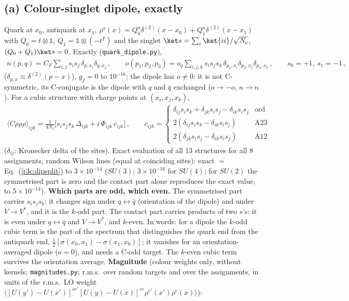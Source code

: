 \subsection{(a) Colour-singlet dipole, exactly}\label{r3c:dipole}
Quark at $x_0$, antiquark at $x_1$, $\rho^a(x)=Q_0^a\delta^{(2)}(x-x_0)+Q_1^a\delta^{(2)}(x-x_1)$ with $Q_0=t\otimes\mathbb 1$, $Q_1=\mathbb 1\otimes(-t^T)$ and the singlet $\ket s=\sum_i\ket{ii}/\sqrt{N_c}$, $(Q_0+Q_1)\ket s=0$. Exactly (\texttt{quark\_dipole.py}),
\begin{align}\label{r3c:dip}
n(p,q)=C_F\sum_{i,j}s_is_j\,\delta_{p,x_i}\delta_{q,x_j}\,,\qquad o(p_1,p_2,p_3)=o_q\sum_{i,j,k}s_is_js_k\,\delta_{p_1,x_i}\delta_{p_2,x_j}\delta_{p_3,x_k}\,,\qquad s_0=+1,\ s_1=-1\,,
\end{align}
($\delta_{p,x}\equiv\delta^{(2)}(p-x)$), $g_f=0$ to $10^{-16}$; the dipole has $o\neq0$: it is not C-symmetric, its C-conjugate is the dipole with $q$ and $\bar q$ exchanged ($o\to-o$, $n\to n$). For a cubic structure with charge points at $(x_i,x_j,x_k)$,
\begin{align}\label{r3c:dipsplit}
\langle C\rho\rho\rho\rangle_{ijk}=\frac{1}{4N_c}\Big[s_is_js_k\,\Delta_{ijk}+i\,\Phi_{ijk}\,c_{ijk}\Big]\,,\qquad
c_{ijk}=\begin{cases}\delta_{ij}s_is_k+\delta_{jk}s_is_j-\delta_{ik}s_is_j&\text{ord}\\ 2(\delta_{ij}s_is_k-\delta_{ik}s_is_j)&\text{A23}\\ 2(\delta_{jk}s_is_j-\delta_{ik}s_is_j)&\text{A12}\end{cases}
\end{align}
($\delta_{ij}$: Kronecker delta of the sites). Exact evaluation of all 13 structures for all 8 assignments, random Wilson lines (equal at coinciding sites): exact $=$ Eq.~(\ref{r3c:dipsplit}) to $3\times10^{-14}$ ($SU(3)$; $3\times10^{-16}$ for $SU(4)$; for $SU(2)$ the symmetrised part is zero and the contact part alone reproduces the exact value, to $5\times10^{-14}$). \textbf{Which parts are odd, which even.} The symmetrised part carries $s_is_js_k$: it changes sign under $q\leftrightarrow\bar q$ (orientation of the dipole) and under $V\to V^*$, and it is the $k$-odd part. The contact part carries products of two $s$'s: it is even under $q\leftrightarrow\bar q$ and $V\to V^*$, and $k$-even. In words: for a dipole the $k$-odd cubic term is the part of the spectrum that distinguishes the quark end from the antiquark end, $\frac12[\sigma(x_0,x_1)-\sigma(x_1,x_0)]$; it vanishes for an orientation-averaged dipole ($o=0$), and needs a C-odd target. The $k$-even cubic term survives the orientation average. \textbf{Magnitude} (colour weights only, without kernels; \texttt{magnitudes.py}; r.m.s.\ over random targets and over the assignments, in units of the r.m.s.\ LO weight $\langle[U(y')-U(x')]^{ce'}[U(y)-U(x)]^{ce}\rho^{e'}(x')\rho^e(x)\rangle$):
